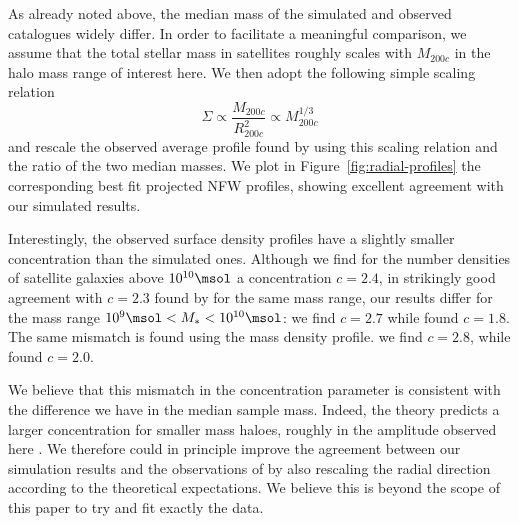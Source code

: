 As already noted above, the median  mass of the simulated and observed
catalogues  widely  differ.  In   order  to  facilitate  a  meaningful
comparison,  we  assume that  the  total  stellar mass  in  satellites
roughly  scales with  $M_{200c}$ in  the halo  mass range  of interest
here. We then adopt the following simple scaling relation
\begin{equation}
\Sigma \propto \frac{M_{200c}}{R_{200c}^2} \propto M_{200c}^{1/3}
\end{equation}
and    rescale    the    observed    average    profile    found    by
\citet{vanderburgEvidenceInsideoutGrowth2015}   using   this   scaling
relation  and  the  ratio  of  the  two  median  masses.  We  plot  in
Figure~\ref{fig:radial-profiles} the corresponding best fit projected NFW
profiles, showing excellent agreement with our simulated results.

Interestingly, the  observed surface density profiles  have a slightly
smaller concentration than  the simulated ones.  Although  we find for
the  number densities  of  satellite galaxies  above $10^{10}\msol$  a
concentration $c  = 2.4$,  in strikingly  good agreement  with $c=2.3$
found  by \citet{vanderburgEvidenceInsideoutGrowth2015}  for the  same
mass range, our results differ for the  mass range $10^9 \msol < M_* <
10^{10}        \msol$:       we        find       $c=2.7$        while
\citet{vanderburgEvidenceInsideoutGrowth2015} found  $c=1.8$. The same
mismatch is  found using the  mass density profile.  we  find $c=2.8$,
while \citet{vanderburgEvidenceInsideoutGrowth2015} found $c=2.0$.

We  believe  that this  mismatch  in  the concentration  parameter  is
consistent  with  the   difference  we  have  in   the  median  sample
mass. Indeed, the  theory predicts a larger  concentration for smaller
mass haloes, roughly in the amplitude observed here \citep{zhaoAccurateUniversalModels2009}.
We therefore  could in principle improve the agreement
between   our    simulation   results   and   the    observations   of
\citet{vanderburgEvidenceInsideoutGrowth2015}  by  also rescaling  the
radial direction according to the theoretical expectations. We believe
this is  beyond the  scope of this  paper to try  and fit  exactly the
data.

